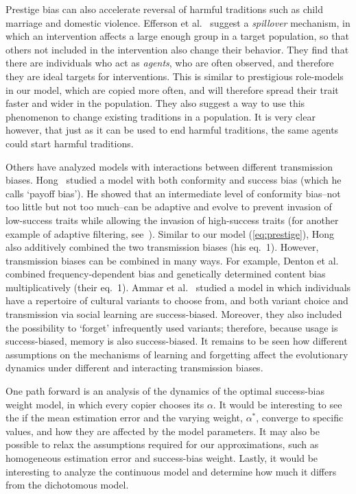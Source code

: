 \documentclass[12pt]{extarticle}
\begin{document}
Prestige bias can also accelerate reversal of harmful traditions such as child marriage and domestic violence. 
Efferson et al.~\citep{harmful_traditions} suggest a \emph{spillover} mechanism, in which an intervention affects a large enough group in a target population, so that others not included in the intervention also change their behavior.
They find that there are individuals who act as \emph{agents}, who are often observed, and therefore they are ideal targets for interventions. This is similar to prestigious role-models in our model, which are copied more often, and will therefore spread their trait faster and wider in the population.
They also suggest a way to use this phenomenon to change existing traditions in a population.
It is very clear however, that just as it can be used to end harmful traditions, the same agents could start harmful traditions.

Others have analyzed models with interactions between different transmission biases.
Hong~\citep{payoff} studied a model with both conformity and success bias (which he calls `payoff bias'). 
He showed that an intermediate level of conformity bias--not too little but not too much--can be adaptive and evolve to prevent invasion of low-success traits while allowing the invasion of high-success traits (for another example of adaptive filtering, see~\citep{adaptive_filtering}).
Similar to our model (\cref{eq:prestige}), Hong~\citep{payoff} also additively combined the two transmission biases (his eq.~1). However, transmission biases can be combined in many ways. 
For example, Denton et al.~\citep{Denton2022} combined frequency-dependent bias and genetically determined content bias multiplicatively (their eq.~1). 
Ammar et al.~\citep{Ammar2023} studied a model in which individuals have a repertoire of cultural variants to choose from, and both variant choice and transmission via social learning are success-biased. Moreover, they also included the possibility to `forget' infrequently used variants; therefore, because usage is success-biased, memory is also success-biased. It remains to be seen how different assumptions on the mechanisms of learning and forgetting affect the evolutionary dynamics under different and interacting transmission biases.

One path forward is an analysis of the dynamics of the optimal success-bias weight model, in which every copier chooses its $\alpha$. It would be interesting to see the if the mean estimation error and the varying weight, $\alpha^*$, converge to specific values, and how they are affected by the model parameters.
It may also be possible to relax the assumptions required for our approximations, such as homogeneous estimation error and success-bias weight.
Lastly, it would be interesting to analyze the continuous model and determine how much it differs from the dichotomous model. 
\end{document}
